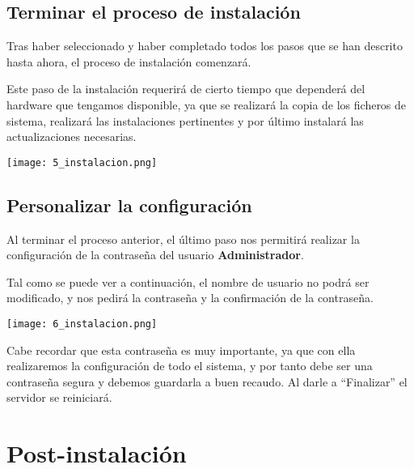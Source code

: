 \subsection{Terminar el proceso de instalación}
{
    \begin{minipage}{0.6\linewidth}
        \setlength{\parskip}{1.2em}
        Tras haber seleccionado y haber completado todos los pasos que se han descrito hasta ahora, el proceso de instalación comenzará.

        Este paso de la instalación requerirá de cierto tiempo que dependerá del hardware que tengamos disponible, ya que se realizará la copia de los ficheros de sistema, realizará las instalaciones pertinentes y por último instalará las actualizaciones necesarias.
    \end{minipage}
    \hfill
    \begin{minipage}{0.36\linewidth}
        \vspace{-11pt}
        \texttt{[image: 5\_instalacion.png]}
    \end{minipage}
}

\subsection{Personalizar la configuración}

{
    \begin{minipage}{0.6\linewidth}
        \setlength{\parskip}{1.2em}
        Al terminar el proceso anterior, el último paso nos permitirá realizar la configuración de la contraseña del usuario \textbf{Administrador}.

        Tal como se puede ver a continuación, el nombre de usuario no podrá ser modificado, y nos pedirá la contraseña y la confirmación de la contraseña.
    \end{minipage}
    \hfill
    \begin{minipage}{0.36\linewidth}
        \vspace{-11pt}
        \texttt{[image: 6\_instalacion.png]}
    \end{minipage}
}

Cabe recordar que esta contraseña es muy importante, ya que con ella realizaremos la configuración de todo el sistema, y por tanto debe ser una contraseña segura y debemos guardarla a buen recaudo. Al darle a “Finalizar” el servidor se reiniciará.

\section{Post-instalación}

